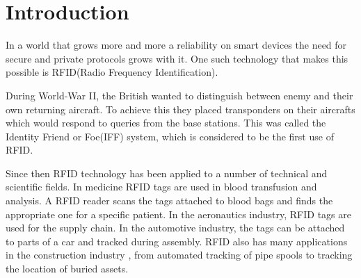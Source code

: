 \chapter*{Introduction} 

        In a world that grows more and more a reliability on smart devices the need for secure and private protocols grows with it. One such technology that makes 
    this possible is RFID(Radio Frequency Identification).

\vspace*{0.1cm}

        During World-War II, the British wanted to distinguish between enemy and their own returning aircraft. To achieve this they placed transponders
    on their aircrafts which would respond to queries from the base stations. This was called the Identity Friend or Foe(IFF) system, which is considered to be the
    first use of RFID.

        Since then RFID technology has been applied to a number of technical and scientific fields. In medicine RFID tags are used in blood transfusion and analysis. 
    A RFID reader scans the tags attached to blood bags and finds the appropriate one for a specific patient. In the aeronautics industry, RFID tags are used for the
    supply chain. In the automotive industry, the tags can be attached to parts of a car and tracked during assembly. RFID also has many applications in the 
    construction industry \cite{Domdouzis}, from automated tracking of pipe spools to tracking the location of buried assets.